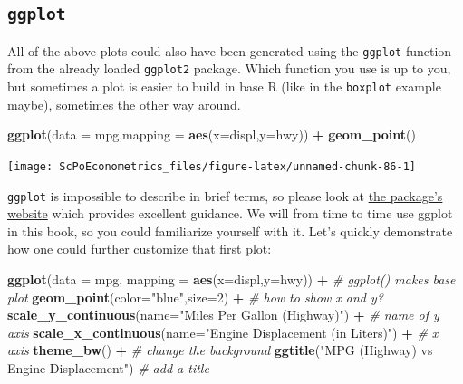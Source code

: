 \documentclass[]{book}
\newenvironment{Shaded}{\begin{snugshade}}{\end{snugshade}}
\newcommand{\KeywordTok}[1]{\textcolor[rgb]{0.13,0.29,0.53}{\textbf{#1}}}
\newcommand{\DataTypeTok}[1]{\textcolor[rgb]{0.13,0.29,0.53}{#1}}
\newcommand{\DecValTok}[1]{\textcolor[rgb]{0.00,0.00,0.81}{#1}}
\newcommand{\StringTok}[1]{\textcolor[rgb]{0.31,0.60,0.02}{#1}}
\newcommand{\CommentTok}[1]{\textcolor[rgb]{0.56,0.35,0.01}{\textit{#1}}}
\newcommand{\OperatorTok}[1]{\textcolor[rgb]{0.81,0.36,0.00}{\textbf{#1}}}
\newcommand{\NormalTok}[1]{#1}
\begin{document}
\subsection{\texorpdfstring{\texttt{ggplot}}{ggplot}}\label{ggplot}

All of the above plots could also have been generated using the
\texttt{ggplot} function from the already loaded \texttt{ggplot2}
package. Which function you use is up to you, but sometimes a plot is
easier to build in base R (like in the \texttt{boxplot} example maybe),
sometimes the other way around.

\begin{Shaded}
\begin{Highlighting}[]
\KeywordTok{ggplot}\NormalTok{(}\DataTypeTok{data =}\NormalTok{ mpg,}\DataTypeTok{mapping =} \KeywordTok{aes}\NormalTok{(}\DataTypeTok{x=}\NormalTok{displ,}\DataTypeTok{y=}\NormalTok{hwy)) }\OperatorTok{+}\StringTok{ }\KeywordTok{geom_point}\NormalTok{()}
\end{Highlighting}
\end{Shaded}

\begin{center}\texttt{[image: ScPoEconometrics\_files/figure-latex/unnamed-chunk-86-1]} \end{center}

\texttt{ggplot} is impossible to describe in brief terms, so please look
at \href{http://ggplot2.tidyverse.org}{the package's website} which
provides excellent guidance. We will from time to time use ggplot in
this book, so you could familiarize yourself with it. Let's quickly
demonstrate how one could further customize that first plot:

\begin{Shaded}
\begin{Highlighting}[]
\KeywordTok{ggplot}\NormalTok{(}\DataTypeTok{data =}\NormalTok{ mpg, }\DataTypeTok{mapping =} \KeywordTok{aes}\NormalTok{(}\DataTypeTok{x=}\NormalTok{displ,}\DataTypeTok{y=}\NormalTok{hwy)) }\OperatorTok{+}\StringTok{   }\CommentTok{# ggplot() makes base plot}
\StringTok{  }\KeywordTok{geom_point}\NormalTok{(}\DataTypeTok{color=}\StringTok{"blue"}\NormalTok{,}\DataTypeTok{size=}\DecValTok{2}\NormalTok{) }\OperatorTok{+}\StringTok{     }\CommentTok{# how to show x and y?}
\StringTok{  }\KeywordTok{scale_y_continuous}\NormalTok{(}\DataTypeTok{name=}\StringTok{"Miles Per Gallon (Highway)"}\NormalTok{) }\OperatorTok{+}\StringTok{  }\CommentTok{# name of y axis}
\StringTok{  }\KeywordTok{scale_x_continuous}\NormalTok{(}\DataTypeTok{name=}\StringTok{"Engine Displacement (in Liters)"}\NormalTok{) }\OperatorTok{+}\StringTok{ }\CommentTok{# x axis}
\StringTok{  }\KeywordTok{theme_bw}\NormalTok{() }\OperatorTok{+}\StringTok{    }\CommentTok{# change the background}
\StringTok{  }\KeywordTok{ggtitle}\NormalTok{(}\StringTok{"MPG (Highway) vs Engine Displacement"}\NormalTok{)   }\CommentTok{# add a title}
\end{Highlighting}
\end{Shaded}
\end{document}
